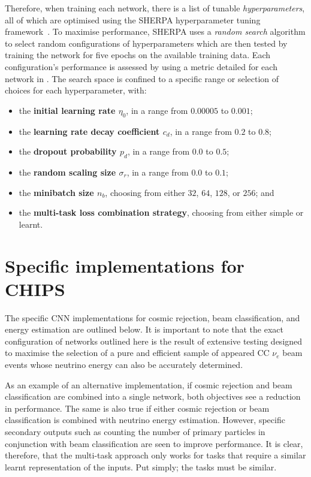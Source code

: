 Therefore, when training each network, there is a list of tunable \emph{hyperparameters}, all of
which are optimised using the SHERPA hyperparameter tuning framework~\cite{hertel2020}. To
maximise performance, SHERPA uses a \emph{random search} algorithm to select random configurations
of hyperparameters which are then tested by training the network for five epochs on the available
training data. Each configuration's performance is assessed by using a metric detailed for each
network in . The search space is confined to a specific range or
selection of choices for each hyperparameter, with:
\begin{itemize}
    \item the \textbf{initial learning rate $\eta_{0}$}, in a range from $0.00005$ to $0.001$;
    \item the \textbf{learning rate decay coefficient $c_{d}$}, in a range from $0.2$ to $0.8$;
    \item the \textbf{dropout probability $p_{d}$}, in a range from $0.0$ to $0.5$;
    \item the \textbf{random scaling size $\sigma_{r}$}, in a range from $0.0$ to $0.1$;
    \item the \textbf{minibatch size $n_{b}$}, choosing from either $32$, $64$, $128$, or $256$;
    and
    \item the \textbf{multi-task loss combination strategy}, choosing from either simple or
    learnt.
\end{itemize}

\section{Specific implementations for CHIPS} %
\label{sec:cnn_specific} %

The specific CNN implementations for cosmic rejection, beam classification, and energy estimation
are outlined below. It is important to note that the exact configuration of networks outlined here
is the result of extensive testing designed to maximise the selection of a pure and efficient
sample of appeared CC $\nu_{e}$ beam events whose neutrino energy can also be accurately
determined.

As an example of an alternative implementation, if cosmic rejection and beam classification are
combined into a single network, both objectives see a reduction in performance. The same is also
true if either cosmic rejection or beam classification is combined with neutrino energy
estimation. However, specific secondary outputs such as counting the number of primary particles
in conjunction with beam classification are seen to improve performance. It is clear, therefore,
that the multi-task approach only works for tasks that require a similar learnt representation of
the inputs. Put simply; the tasks must be similar.

